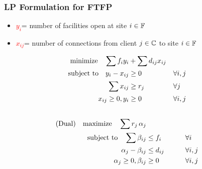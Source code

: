 \documentclass[handout, hyperref, dvipsnames]{beamer}
\begin{document}
\begin{frame}
  \frametitle{LP Formulation for FTFP}
  \begin{itemize}
  \item \textcolor{red}{$y_i$}=   number of facilities open at site $i\in \mathbb{F}$
  \item \textcolor{red}{$x_{ij}$}= number of connections from client $j\in
    \mathbb{C}$ to site $i \in \mathbb{F}$
  \end{itemize}
  \begin{alignat}{3}
    \textrm{minimize}\quad \sum f_iy_i &+ \sum d_{ij}x_{ij}&
    \\ \notag
    \textrm{subject to}\quad y_i - x_{ij} &\geq 0  & &\forall i,j
    \\ \notag
    \sum x_{ij} &\geq r_j & &\forall j
    \\ \notag
    x_{ij} \geq 0, y_i &\geq 0 & &\forall i,j
    \\ \notag
  \end{alignat}
  \begin{alignat}{3}
  \text{(Dual)}\quad  \textrm{maximize}\quad \sum r_j\, \alpha_j&
    \\ \notag
    \textrm{subject to} \quad 
      \sum \beta_{ij} &\leq f_i  &\quad\quad			&\forall i
    \\ \notag
    \alpha_{j} - \beta_{ij} 	&\leq  d_{ij}       &                 & \forall i,j
    \\ \notag
    \alpha_j \geq 0, \beta_{ij} &\geq 0           &            & \forall i,j
  \end{alignat}
\end{frame}

\end{document}
